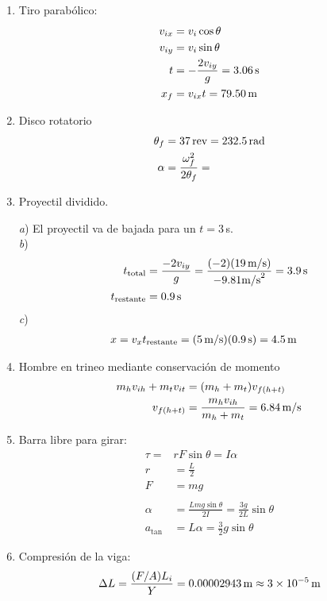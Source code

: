 \documentclass{article}
\begin{document}
\begin{enumerate}

\item Tiro parabólico:
\begin{align*}
v_{ix} &= v_{i} \cos \theta \\
v_{iy} &= v_{i}\sin \theta \\
t &= -\frac{2v_{iy}}{g} = 3.06 \text{\,s} \\
x_{f} &= v_{ix}t = 79.50 \text{\,m}
\end{align*}

\item Disco rotatorio
\begin{align*}
\theta_{f} &= 37 \text{\,rev} = 232.5 \text{\,rad} \\
\alpha &= \frac{\omega_{f}^{2}}{2 \theta_{f}} = 
\end{align*}

\item Proyectil dividido.

\emph{a}) El proyectil va de bajada para un $t=3$\,s. \\
\emph{b}) 
\begin{align*}
t_{\text{total}} &= \frac{-2v_{iy}}{g} = 
\frac{(-2)(19\,\text{m/s})}{-9.81\text{m/s}^{2}} = 3.9\text{\,s} \\
t_{\text{restante}} &= 0.9\text{\,s}
\end{align*}
\emph{c})
\begin{align*}
x &= v_{x} t_{\text{restante}} = (5\text{\,m/s}) (0.9\text{\,s}) = 
4.5\text{\,m}
\end{align*}

\item Hombre en trineo mediante conservación de momento
\begin{align*}
m_{h} v_{ih} + m_{t} v_{it} &= (m_{h} + m_{t}) v_{f(h+t)} \\
v_{f(h+t)} &= \frac{m_{h} v_{ih}}{m_{h} + m_{t}} = 6.84\text{\,m/s}
\end{align*}

\item Barra libre para girar:
\begin{align*}
\tau =& rF \sin \theta = I \alpha \\
r &= \frac{L}{2} \\
F &= mg \\ \\
\alpha &= \frac{Lmg \sin \theta}{2I} = \frac{3g}{2L}\sin \theta \\
a_{\tan} &= L \alpha = \frac{3}{2}g\sin \theta
\end{align*}

\item Compresión de la viga:
\begin{equation*}
\Delta L  =  \frac{(F/A) L_{i}}{Y} = 0.00002943\text{\,m} 
\approx 3 \times 10^{-5}\text{\,m}
\end{equation*}

\end{enumerate}
\end{document}
